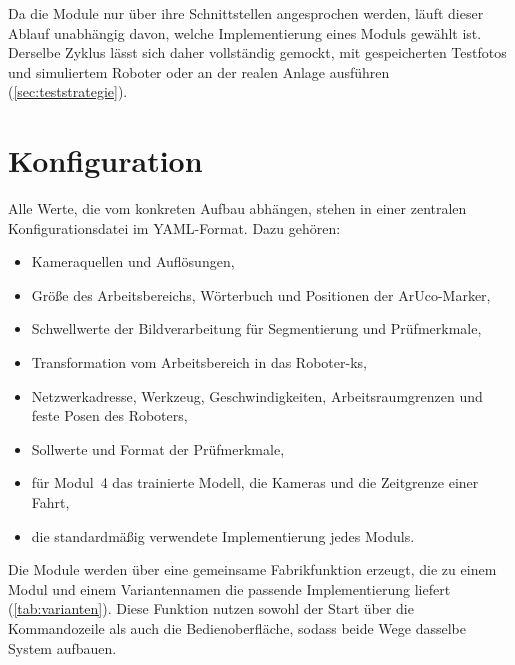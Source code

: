 Da die Module nur über ihre Schnittstellen angesprochen werden, läuft dieser Ablauf
unabhängig davon, welche Implementierung eines Moduls gewählt ist. Derselbe Zyklus lässt sich
daher vollständig gemockt, mit gespeicherten Testfotos und simuliertem Roboter oder an der
realen Anlage ausführen (\cref{sec:teststrategie}).

\section{Konfiguration}
\label{sec:int-konfiguration}

Alle Werte, die vom konkreten Aufbau abhängen, stehen in einer zentralen
Konfigurationsdatei im YAML-Format. Dazu gehören:
\begin{itemize}
  \item Kameraquellen und Auflösungen,
  \item Größe des Arbeitsbereichs, Wörterbuch und Positionen der ArUco-Marker,
  \item Schwellwerte der Bildverarbeitung für Segmentierung und Prüfmerkmale,
  \item Transformation vom Arbeitsbereich in das Roboter-\ac{ks},
  \item Netzwerkadresse, Werkzeug, Geschwindigkeiten, Arbeitsraumgrenzen und feste Posen des
        Roboters,
  \item Sollwerte und Format der Prüfmerkmale,
  \item für Modul~4 das trainierte Modell, die Kameras und die Zeitgrenze einer Fahrt,
  \item die standardmäßig verwendete Implementierung jedes Moduls.
\end{itemize}

Die Module werden über eine gemeinsame Fabrikfunktion erzeugt, die zu einem Modul und einem
Variantennamen die passende Implementierung liefert (\cref{tab:varianten}). Diese Funktion
nutzen sowohl der Start über die Kommandozeile als auch die Bedienoberfläche, sodass beide
Wege dasselbe System aufbauen.

